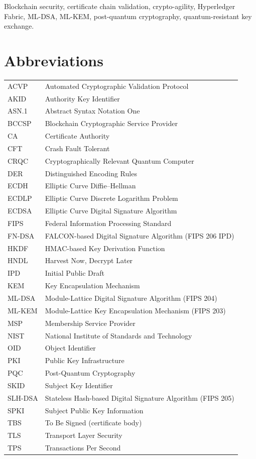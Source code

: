 \documentclass{ieeetj}
\begin{document}
\begin{IEEEkeywords}
{Blockchain security, certificate chain validation, crypto-agility,
Hyperledger Fabric, ML-DSA, ML-KEM, post-quantum cryptography, quantum-resistant
key exchange.}
\end{IEEEkeywords}

\section*{Abbreviations}
\begin{tabular}{@{}p{1.7cm}p{6.0cm}@{}}
ACVP    & Automated Cryptographic Validation Protocol \\
AKID    & Authority Key Identifier \\
ASN.1   & Abstract Syntax Notation One \\
BCCSP   & Blockchain Cryptographic Service Provider \\
CA      & Certificate Authority \\
CFT     & Crash Fault Tolerant \\
CRQC    & Cryptographically Relevant Quantum Computer \\
DER     & Distinguished Encoding Rules \\
ECDH    & Elliptic Curve Diffie--Hellman \\
ECDLP   & Elliptic Curve Discrete Logarithm Problem \\
ECDSA   & Elliptic Curve Digital Signature Algorithm \\
FIPS    & Federal Information Processing Standard \\
FN-DSA  & FALCON-based Digital Signature Algorithm (FIPS 206 IPD) \\
HKDF    & HMAC-based Key Derivation Function \\
HNDL    & Harvest Now, Decrypt Later \\
IPD     & Initial Public Draft \\
KEM     & Key Encapsulation Mechanism \\
ML-DSA  & Module-Lattice Digital Signature Algorithm (FIPS 204) \\
ML-KEM  & Module-Lattice Key Encapsulation Mechanism (FIPS 203) \\
MSP     & Membership Service Provider \\
NIST    & National Institute of Standards and Technology \\
OID     & Object Identifier \\
PKI     & Public Key Infrastructure \\
PQC     & Post-Quantum Cryptography \\
SKID    & Subject Key Identifier \\
SLH-DSA & Stateless Hash-based Digital Signature Algorithm (FIPS 205) \\
SPKI    & Subject Public Key Information \\
TBS     & To Be Signed (certificate body) \\
TLS     & Transport Layer Security \\
TPS     & Transactions Per Second \\
\end{tabular}
\end{document}
